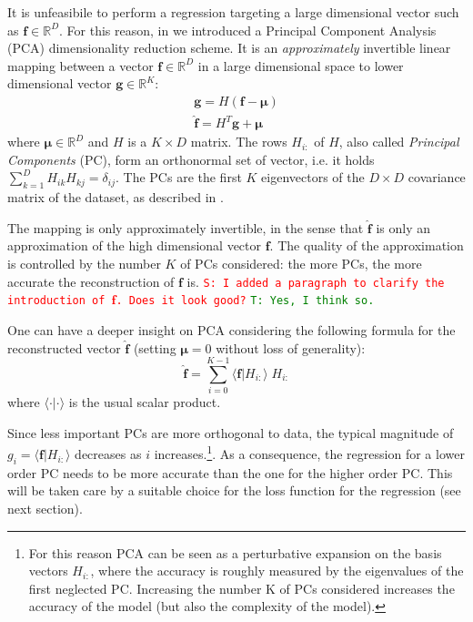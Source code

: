\documentclass[twocolumn,showpacs,preprintnumbers,nofootinbib,prd,
superscriptaddress,10pt]{revtex4-1}
\newcommand{\R}{\mathbb{R}}
\newcommand{\stefano}[1]{{\textcolor{red}{\texttt{S: #1}} }}
\newcommand{\tim}[1]{{\textcolor{green}{\texttt{T: #1}} }}
\begin{document}
It is unfeasibile to perform a regression targeting a large dimensional vector such as $\boldsymbol{f} \in \R^D$. For this reason, in \cite{Schmidt:2020yuu} we introduced a Principal Component Analysis (PCA) dimensionality reduction scheme.
It is an {\it approximately} invertible linear mapping between a vector $\boldsymbol{f} \in \R^D$ in a large dimensional space to lower dimensional vector  $\boldsymbol{g} \in \R^K$:
%
\begin{align}
	\mathbf{g} = H (\mathbf{f} - \boldsymbol{\mu}) \label{eq:PCA_reduction_model}\\
	\hat{\mathbf{f}} = H^T \mathbf{g} + \boldsymbol{\mu} \label{eq:PCA_reconstruction_model}
\end{align}
where $\boldsymbol{\mu} \in \R^D$ and $H$ is a $K \times D$ matrix.
The rows $H_{i:}$ of $H$, also called {\it Principal Components} (PC), form an orthonormal set of vector, i.e. it holds ${\sum_{k=1}^D H_{ik} H_{kj} = \delta_{ij}}$.
The PCs are the first $K$ eigenvectors of the $D \times D$ covariance matrix of the dataset, as described in \cite[Sec. 12]{murphy2012machine}.

The mapping is only approximately invertible, in the sense that $\hat{\mathbf{f}}$ is only an approximation of the high dimensional vector $\mathbf{f}$. The quality of the approximation is controlled by the number $K$ of PCs considered: the more PCs, the more accurate the reconstruction of $\mathbf{f}$ is. \stefano{I added a paragraph to clarify the introduction of $\hat{\mathbf{f}}$. Does it look good?} \tim{Yes, I think so.}

One can have a deeper insight on PCA considering the following formula for the reconstructed vector $\hat{\mathbf{f}}$ (setting $\boldsymbol{\mu}=0$ without loss of generality):
\begin{equation} \label{eq:perturbative_exp}
	\hat{\mathbf{f}} = \sum_{i=0}^{K-1} \langle \mathbf{f} | H_{i:} \rangle \; H_{i:}
\end{equation}
%
where $\langle \cdot | \cdot \rangle$ is the usual scalar product.

Since less important PCs are more orthogonal to data, the typical magnitude of $g_i = \langle \mathbf{f} | H_{i:} \rangle$ decreases as $i$ increases.\footnote{For this reason PCA can be seen as a perturbative expansion on the basis vectors $H_{i:}$, where the accuracy is roughly measured by the eigenvalues of the first neglected PC. Increasing the number K of PCs considered increases the accuracy of the model (but also the complexity of the model).}.
As a consequence, the regression for a lower order PC needs to be more accurate than the one for the higher order PC. This will be taken care by a suitable choice for the loss function for the regression (see next section).
\end{document}
